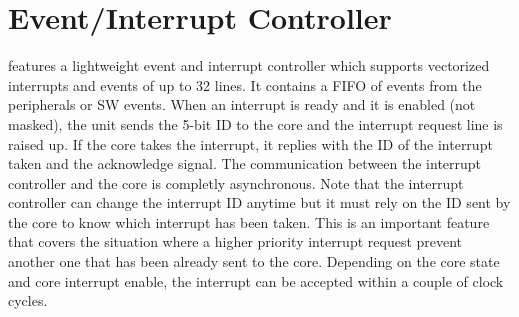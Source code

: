 \section{Event/Interrupt Controller}

\pulpissimo features a lightweight event and interrupt controller which supports
vectorized interrupts and events of up to 32 lines. It contains a FIFO of events
from the peripherals or SW events. When an interrupt is ready and it is enabled
(not masked), the unit sends the 5-bit ID to the core and the interrupt request
line is raised up. If the core takes the interrupt, it replies with the ID of
the interrupt taken and the acknowledge signal. The communication between the
interrupt controller and the core is completly asynchronous. Note that the
interrupt controller can change the interrupt ID anytime but it must rely on the
ID sent by the core to know which interrupt has been taken. This is an important
feature that covers the situation where a higher priority interrupt request
prevent another one that has been already sent to the core. Depending on the
core state and core interrupt enable, the interrupt can be accepted within a
couple of clock cycles.



